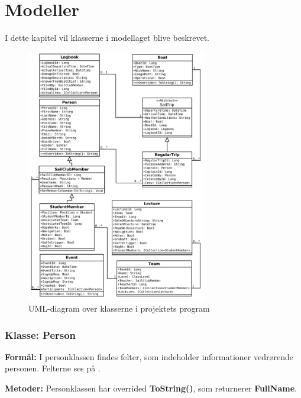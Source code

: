 \chapter{Modeller} \label{chap:klasser}

I dette kapitel vil klasserne i modellaget blive beskrevet.

\begin{figure}[H]
  \centering
  \includegraphics[width=0.70\textwidth]{images/flowcharts/UML.pdf}
  \caption{UML-diagram over klasserne i projektets program}
  \label{img:UML}
\end{figure}

\subsection{Klasse: Person} 
\textbf{Formål:}
I personklassen findes felter, som indeholder informationer vedrørende personen. Felterne ses på .

\textbf{Metoder:}
Personklassen har overrided \textbf{ToString()}, som returnerer \textbf{FullName}.

